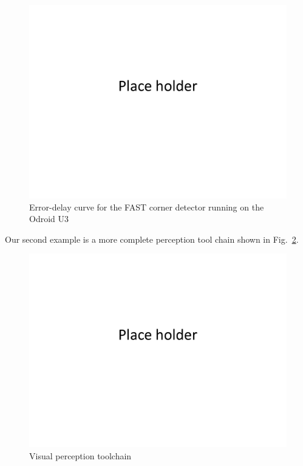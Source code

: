\begin{figure}[t]
\centering
\includegraphics[width=0.7\linewidth]{figures/placeHolder}
\caption{Error-delay curve for the FAST corner detector running on the Odroid U3}
\label{fig:fast}
\end{figure}

Our second example is a more complete perception tool chain shown in Fig.~\ref{fig:chain}.
\begin{figure}[t]
	\centering
	\includegraphics[width=0.7\linewidth]{figures/placeHolder}
	\caption{Visual perception toolchain}
	\label{fig:chain}
\end{figure}

